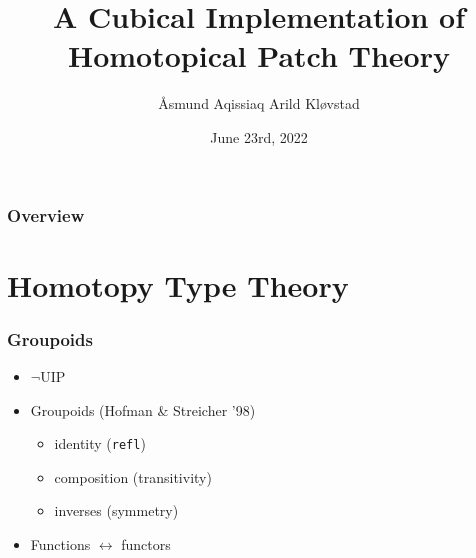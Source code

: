 \documentclass{beamer}
\title[A Cubical Implementation of Homotopical Patch Theory]{A Cubical Implementation of Homotopical Patch Theory} %
\author{Åsmund Aqissiaq Arild Kløvstad} %
\institute[UiB] %
{
Universitetet i Bergen \\ %
}
\date{June 23rd, 2022} %
\begin{document}
\begin{frame}
\titlepage %
\end{frame}

\begin{frame}
\frametitle{Overview} %
\tableofcontents %
\end{frame}


\section{Homotopy Type Theory}



\begin{frame}
\frametitle{Groupoids}
\begin{itemize}
\item $\neg$UIP
\item Groupoids (Hofman \& Streicher '98)
  \begin{itemize}
    \item identity (\texttt{refl})
    \item composition (transitivity)
    \item inverses (symmetry)
  \end{itemize}
\item Functions $\leftrightarrow$ functors
\end{itemize}
\end{frame}



\AtBeginSection[]
{
    \begin{frame}
        \tableofcontents[currentsection]
    \end{frame}
} 
\end{document}
